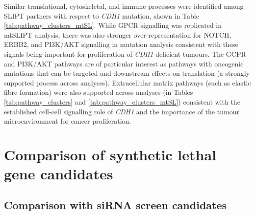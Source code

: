 Similar translational, cytoskeletal, and immune processes were identified among SLIPT partners with respect to \textit{CDH1} mutation, shown in Table \ref{tab:pathway_clusters_mtSL}. While GPCR signalling was replicated in mtSLIPT analysis, there was also stronger over-representation for NOTCH, ERBB2, and PI3K/AKT signalling in mutation analysis consistent with these signals being important for proliferation of \textit{CDH1} deficient tumours. The GCPR and PI3K/AKT pathways are of particular interest as pathways with oncogenic mutations that can be targeted and downstream effects on translation (a strongly supported process across analyses). Extracellular matrix pathways (such as elastic fibre formation) were also supported across analyses (in Tables \ref{tab:pathway_clusters} and \ref{tab:pathway_clusters_mtSL}) consistent with the established cell-cell signalling role of \textit{CDH1} and the importance of the tumour microenvironment for cancer proliferation.



\FloatBarrier

\section{Comparison of synthetic lethal gene candidates} \label{chapt3:compare_SL_genes}  



\subsection{Comparison with siRNA screen candidates} \label{chapt3:primary_screen}

